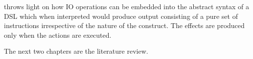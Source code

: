 \documentclass[thesis-solanki.tex]{subfiles}
\begin{document}
 throws light on how IO operations can be embedded into the abstract syntax
of a DSL which when interpreted would produce output consisting of a pure set of instructions irrespective of the
nature of the construct.
The effects are produced only when the actions are executed.

\begin{comment}
\section{Thesis Improved Contributions}\label{sec:thes-impr-contr}

\begin{enumerate}
\item Prototype 1 does
flattening language
opening up the language (binding monad)
adding custom variables
monadic unification (stuff happens in a bubble)
rec type $\rightarrow$ non rec type $\rightarrow$ fix non rec type isomorphically == rec type

You can make an Flatterm int

but you cannot make term int

adding quantifiers


\item Prototype 2 does
extends current prolog-0.2.0.1
this is to show that we can plug out approach into existing implementation and things work

\item Prototype 3 does
variable search strategy
what ever method you do for searching at the point of unification you can do it with our approach

\item Prototype 4 does
how can io be squeezed into this model where whenever the resolver encounters an io operation it generates a thunk (sort of unsolved
statement) which when executed would result in a side effect but till that point every thing is pure

\end{enumerate}
\end{comment}

The next two chapters are the literature review.

\ifMain\ifDraft
\begin{scope}
  \nolinenumbers
  \enotesize
  \par
  \begin{singlespace}
  \setlength{\parskip}{12pt plus 2pt minus 1pt}
  \theendnotes
  \par
  \end{singlespace}
\end{scope}
\fi\fi
\end{document}
